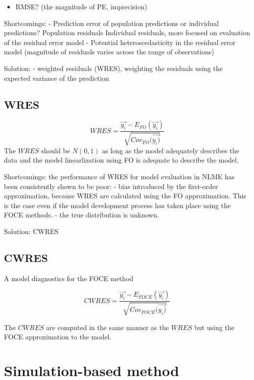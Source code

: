 \documentclass[
]{book}
\providecommand{\tightlist}{%
  \setlength{\itemsep}{0pt}\setlength{\parskip}{0pt}}
\begin{document}
\begin{itemize}
\tightlist
\item
  RMSE? (the magnitude of PE, imprecision)
\end{itemize}

Shortcomings:
- Prediction error of population predictions or individual predictions?
Population residuals
Individual residuals, more focused on evaluation of the residual error model
- Potential heteroscedasticity in the residual error model (magnitude of residuals varies across the range of observations)

Solution:
- weighted residuals (WRES), weighting the residuals using the expected variance of the prediction

\hypertarget{wres}{%
\subsection{WRES}\label{wres}}

\[
   WRES=\frac{\vec{y_{i}}-E_{FO}(\vec{y_{i}})}{ \sqrt{Cov_{FO}(\vec{y_{i})}}}
\]
The \(WRES\) should be \(N(0,1)\) as long as the model adequately describes the data and the model linearlization using FO is adequate to describe the model.

Shortcomings: the performance of WRES for model evaluation in NLME has been consistently shown to be poor:
- bias introduced by the first-order approximation, because WRES are calculated using the FO approximation. This is the case even if the model development process has taken place using the FOCE methods.
- the true distribution is unknown.

Solution: CWRES

\hypertarget{cwres}{%
\subsection{CWRES}\label{cwres}}

A model diagnostics for the FOCE method

\[
   CWRES=\frac{\vec{y_{i}}-E_{FOCE}(\vec{y_{i}})}{ \sqrt{Cov_{FOCE}(\vec{y_{i})}}}
\]

The \(CWRES\) are computed in the same manner as the \(WRES\) but using the FOCE approximation to the model.

\hypertarget{simulation-based-method}{%
\section{Simulation-based method}\label{simulation-based-method}}
\end{document}
